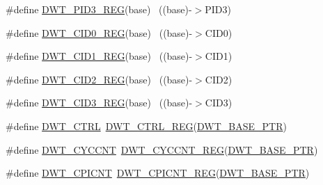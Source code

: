 \begin{DoxyCompactItemize}
\item 
\#define \hyperlink{group___d_w_t___register___accessor___macros_ga0cbc2af1666ca376f4593b2ee568ea1a}{D\+W\+T\+\_\+\+P\+I\+D3\+\_\+\+R\+EG}(base)                                          ~((base)-\/$>$P\+I\+D3)
\item 
\#define \hyperlink{group___d_w_t___register___accessor___macros_gab77163d0264bc009ac5622e766e24a93}{D\+W\+T\+\_\+\+C\+I\+D0\+\_\+\+R\+EG}(base)                                          ~((base)-\/$>$C\+I\+D0)
\item 
\#define \hyperlink{group___d_w_t___register___accessor___macros_ga029e546d2d8949b27c55a4785da019eb}{D\+W\+T\+\_\+\+C\+I\+D1\+\_\+\+R\+EG}(base)                                          ~((base)-\/$>$C\+I\+D1)
\item 
\#define \hyperlink{group___d_w_t___register___accessor___macros_gab6a7a7788e8fdbbe47ac13383064a1e8}{D\+W\+T\+\_\+\+C\+I\+D2\+\_\+\+R\+EG}(base)                                          ~((base)-\/$>$C\+I\+D2)
\item 
\#define \hyperlink{group___d_w_t___register___accessor___macros_ga7a29c7e2d907c373f1ffa34877e83852}{D\+W\+T\+\_\+\+C\+I\+D3\+\_\+\+R\+EG}(base)                                          ~((base)-\/$>$C\+I\+D3)
\item 
\#define \hyperlink{group___d_w_t___register___accessor___macros_ga90b9ebedff8635727698afd2fa84b90a}{D\+W\+T\+\_\+\+C\+T\+RL}~\hyperlink{group___d_w_t___register___accessor___macros_ga805e8330d1aa986d534abe1eed2614df}{D\+W\+T\+\_\+\+C\+T\+R\+L\+\_\+\+R\+EG}(\hyperlink{group___d_w_t___peripheral_ga3b46dfb2ea7946c6938028d879c82cb1}{D\+W\+T\+\_\+\+B\+A\+S\+E\+\_\+\+P\+TR})
\item 
\#define \hyperlink{group___d_w_t___register___accessor___macros_ga01aca3c6bc0f9d7b0f524442ded3f37c}{D\+W\+T\+\_\+\+C\+Y\+C\+C\+NT}~\hyperlink{group___d_w_t___register___accessor___macros_ga745c3ae737eb0e94dde4b3e1178920af}{D\+W\+T\+\_\+\+C\+Y\+C\+C\+N\+T\+\_\+\+R\+EG}(\hyperlink{group___d_w_t___peripheral_ga3b46dfb2ea7946c6938028d879c82cb1}{D\+W\+T\+\_\+\+B\+A\+S\+E\+\_\+\+P\+TR})
\item 
\#define \hyperlink{group___d_w_t___register___accessor___macros_ga9e017822b9666f9bed09efcb9a5542a5}{D\+W\+T\+\_\+\+C\+P\+I\+C\+NT}~\hyperlink{group___d_w_t___register___accessor___macros_ga57a7caeb5e0d4038c88b5adb8a31ac4e}{D\+W\+T\+\_\+\+C\+P\+I\+C\+N\+T\+\_\+\+R\+EG}(\hyperlink{group___d_w_t___peripheral_ga3b46dfb2ea7946c6938028d879c82cb1}{D\+W\+T\+\_\+\+B\+A\+S\+E\+\_\+\+P\+TR})
\item 

\end{DoxyCompactItemize}
